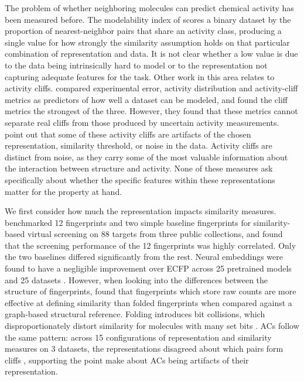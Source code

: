 The problem of whether neighboring molecules can predict chemical activity has been measured before. The modelability index of \citet{Golbraikh2014} scores a binary dataset by the proportion of nearest-neighbor pairs that share an activity class, producing a single value for how strongly the similarity assumption holds on that particular combination of representation and data. It is not clear whether a low value is due to the data being intrinsically hard to model or to the representation not capturing adequate features for the task. Other work in this area relates to activity cliffs. \citet{Sheridan2020} compared experimental error, activity distribution and activity-cliff metrics as predictors of how well a dataset can be modeled, and found the cliff metrics the strongest of the three. However, they found that these metrics cannot separate real cliffs from those produced by uncertain activity measurements. \citet{MedinaFranco2013} point out that some of these activity cliffs are artifacts of the chosen representation, similarity threshold, or noise in the data. Activity cliffs are distinct from noise, as they carry some of the most valuable information about the interaction between structure and activity. None of these measures ask specifically about whether the specific features within these representations matter for the property at hand. 


We first consider how much the representation impacts similarity measures. \citet{Riniker2013} benchmarked 12 fingerprints and two simple baseline fingerprints for similarity-based virtual screening on 88 targets from three public collections, and found that the screening performance of the 12 fingerprints was highly correlated. Only the two baselines differed significantly from the rest. Neural embeddings were found to have a negligible improvement over ECFP across 25 pretrained models and 25 datasets \citep{Praski2025}. However, when looking into the differences between the structure of fingerprints, \citet{Huber2026} found that fingerprints which store raw counts are more effective at defining similarity than folded fingerprints when compared against a graph-based structural reference. Folding introduces bit collisions, which disproportionately distort similarity for molecules with many set bits \citep{Huber2026}. ACs follow the same pattern: across 15 configurations of representation and similarity measures on 3 datasets, the representations disagreed about which pairs form cliffs \citep{DabrowskiTumanski2026}, supporting the point \citet{MedinaFranco2013} make about ACs being artifacts of their representation. 

